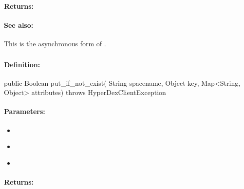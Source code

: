 \paragraph{Returns:}


\paragraph{See also:}  This is the asynchronous form of .

\pagebreak
\subsubsection{}
\label{api:java:put_if_not_exist}


\paragraph{Definition:}
\begin{javacode}
public Boolean put_if_not_exist(
        String spacename,
        Object key,
        Map<String, Object> attributes) throws HyperDexClientException
\end{javacode}

\paragraph{Parameters:}
\begin{itemize}[noitemsep]
\item {}\\

\item {}\\

\item {}\\

\end{itemize}

\paragraph{Returns:}


